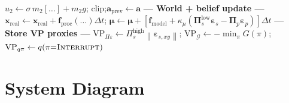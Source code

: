 \documentclass[11pt, a4paper]{article}
\newcommand{\vect}[1]{\bm{#1}}
\newcommand{\mat}[1]{\mathbf{#1}}
\newcommand{\EFE}{\mathcal{G}}
\newcommand{\norm}[1]{\left\|#1\right\|}
\newcommand{\Pip}{\mat{\Pi}_p}
\newcommand{\Pisl}{\mat{\Pi}_s^{\mathrm{low}}}
\newcommand{\Pish}{\Pi_s^{\mathrm{high}}}
\newcommand{\epsp}{\vect{\varepsilon}_p}
\newcommand{\epss}{\vect{\varepsilon}_s}
\begin{document}
\begin{algorithm}[H]
\begin{algorithmic}[1]
         $u_2 \leftarrow \sigma\,m_2[\ldots] + m_2 g$;\quad
         clip;\quad $\vect{a}_{\mathrm{prev}} \leftarrow \vect{a}$
  \State
  \State \textbf{--- World + belief update ---}
  \State $\vect{x}_{\mathrm{real}} \leftarrow \vect{x}_{\mathrm{real}}
         + \vect{f}_{\mathrm{proc}}(\ldots)\Delta t$;\quad
         $\vect{\mu} \leftarrow \vect{\mu}
         + [\vect{f}_{\mathrm{model}} + \kappa_\mu(\Pisl\epss
         - \Pip\epsp)]\Delta t$
  \State
  \State \textbf{--- Store VP proxies ---}
  \State $\mathrm{VP}_{\Pi\varepsilon} \leftarrow \Pish\norm{\vect{\varepsilon}_{s,xy}}$;\quad
         $\mathrm{VP}_{\EFE} \leftarrow -\min_\pi G(\pi)$;\quad
         $\mathrm{VP}_{q\pi} \leftarrow q(\pi{=}\textsc{Interrupt})$
\EndFor
\end{algorithmic}
\end{algorithm}

\section{System Diagram}
\end{document}
